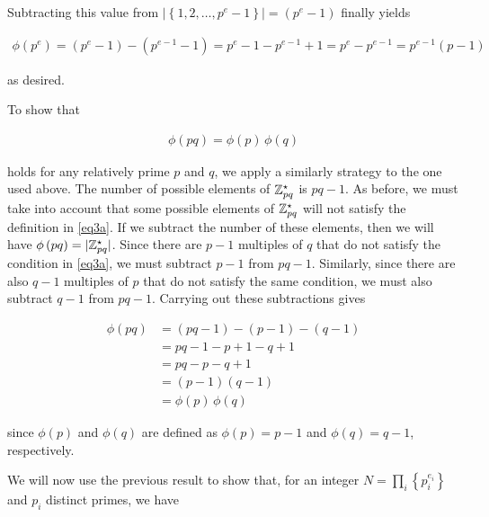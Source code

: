 \documentclass[../CryptoFinal.tex]{subfiles}
\begin{document}
\begin{flushleft}
Subtracting this value from $\lvert \left\{ 1, 2, \dots, p^e - 1 \right\} \rvert = \left(p^e - 1\right)$ finally yields

\begin{align*}
  \phi \left( p^e \right) = \left(p^e - 1\right) - \left(p^{e-1} - 1\right) = p^e - 1 - p^{e-1} + 1 = p^e - p^{e-1} = p^{e-1} \left( p - 1 \right)
\end{align*}

as desired. \newline

To show that

\begin{align*}
  \phi \left( p q \right) = \phi \left( p \right) \, \phi \left( q \right)
\end{align*} 

holds for any relatively prime $p$ and $q$, we apply a similarly strategy to the one used above.  The number of possible elements of $\mathbb{Z}_{pq}^\star$ is $pq - 1$.  As before, we must take into account that some possible elements of $\mathbb{Z}_{pq}^\star$ will not satisfy the definition in \ref{eq3a}.  If we subtract the number of these elements, then we will have $\phi \left( p q \right) = \lvert \mathbb{Z}_{pq}^\star \rvert$.  Since there are $p - 1$ multiples of $q$ that do not satisfy the condition in \ref{eq3a}, we must subtract $p - 1$ from $pq - 1$.  Similarly, since there are also $q - 1$ multiples of $p$ that do not satisfy the same condition, we must also subtract $q - 1$ from $pq - 1$.  Carrying out these subtractions gives 

\begin{align*}
  \phi \left( p q \right) &= \left( p q - 1 \right) - \left( p - 1 \right) - \left( q - 1 \right) \\
  &= pq - 1 - p + 1 - q + 1 \\
  &= pq - p - q + 1 \\
  &= \left( p - 1 \right) \left( q - 1 \right) \\
  &= \phi \left( p \right) \, \phi \left( q \right)
\end{align*}

since $\phi \left( p \right)$ and $\phi \left( q \right)$ are defined as $\phi \left( p \right) = p - 1$ and $\phi \left( q \right) = q - 1$, respectively. \newline

We will now use the previous result to show that, for an integer $N = \prod_i \left\{ p_i^{e_i} \right\}$ and $p_i$ distinct primes, we have


\end{flushleft}
\end{document}
